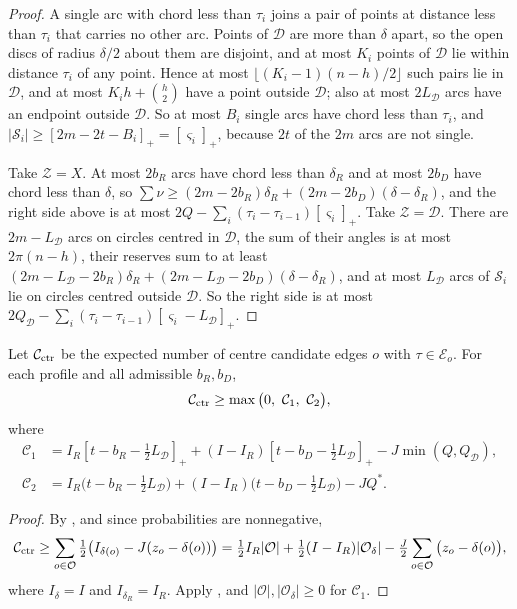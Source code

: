 \documentclass[11pt,colorlinks]{charlie}
\newcommand{\cD}{\mathcal{D}}
\newcommand{\pos}[1]{\left[#1\right]_+}
\begin{document}
\begin{proof}
A single arc with chord less than $\tau_i$ joins a pair of points at distance less than $\tau_i$ that carries no other arc. Points of $\cD$ are more than $\delta$ apart, so the open discs of radius $\delta/2$ about them are disjoint, and at most $K_i$ points of $\cD$ lie within distance $\tau_i$ of any point. Hence at most $\lfloor(K_i-1)(n-h)/2\rfloor$ such pairs lie in $\cD$, and at most $K_ih+\binom h2$ have a point outside $\cD$; also at most $2L_\cD$ arcs have an endpoint outside $\cD$. So at most $B_i$ single arcs have chord less than $\tau_i$, and $|\mathcal S_i|\ge\pos{2m-2t-B_i}=\pos{\varsigma_i}$, because $2t$ of the $2m$ arcs are not single.

Take $\mathcal Z=X$. At most $2b_R$ arcs have chord less than $\delta_R$ and at most $2b_D$ have chord less than $\delta$, so $\sum\nu\ge(2m-2b_R)\delta_R+(2m-2b_D)(\delta-\delta_R)$, and the right side above is at most $2Q-\sum_i(\tau_i-\tau_{i-1})\pos{\varsigma_i}$. Take $\mathcal Z=\cD$. There are $2m-L_\cD$ arcs on circles centred in $\cD$, the sum of their angles is at most $2\pi(n-h)$, their reserves sum to at least $(2m-L_\cD-2b_R)\delta_R+(2m-L_\cD-2b_D)(\delta-\delta_R)$, and at most $L_\cD$ arcs of $\mathcal S_i$ lie on circles centred outside $\cD$. So the right side is at most $2Q_\cD-\sum_i(\tau_i-\tau_{i-1})\pos{\varsigma_i-L_\cD}$.
\end{proof}

\begin{proposition}\label{prop:centres}
Let $\mathcal C_{\rm ctr}$ be the expected number of centre candidate edges $o$ with $\tau\in\mathcal E_o$. For each profile and all admissible $b_R,b_D$,
\[
 \mathcal C_{\rm ctr}\ge\max\big(0,\ \mathcal C_1,\ \mathcal C_2\big),
\]
where
\begin{align*}
 \mathcal C_1&=I_R\pos{t-b_R-\tfrac12L_\cD}+(I-I_R)\pos{t-b_D-\tfrac12L_\cD}-J\min(Q,Q_\cD),\\
 \mathcal C_2&=I_R\big(t-b_R-\tfrac12L_\cD\big)+(I-I_R)\big(t-b_D-\tfrac12L_\cD\big)-JQ^* .
\end{align*}
\end{proposition}

\begin{proof}
By , and since probabilities are nonnegative,
\[
 \mathcal C_{\rm ctr}\ge\sum_{o\in\mathcal O}\tfrac12\big(I_{\delta(o)}-J(z_o-\delta(o))\big)=\tfrac12I_R|\mathcal O|+\tfrac12(I-I_R)|\mathcal O_\delta|-\tfrac J2\sum_{o\in\mathcal O}\big(z_o-\delta(o)\big),
\]
where $I_\delta=I$ and $I_{\delta_R}=I_R$. Apply , and $|\mathcal O|,|\mathcal O_\delta|\ge0$ for $\mathcal C_1$.
\end{proof}
\end{document}
